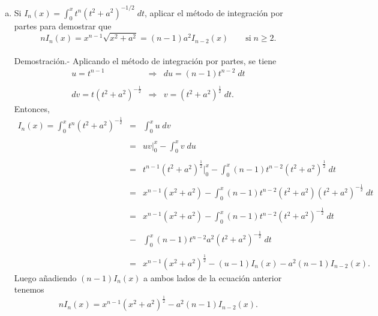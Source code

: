 \begin{enumerate}[\bfseries 1.]
\begin{enumerate}[a)]
	    \item Si $I_n(x)=\int_0^x t^n \left(t^2+a^2\right)^{-1/2}\; dt$, aplicar el método de integración por partes para demostrar que
	    $$nI_n(x)=x^{n-1}\sqrt{x^2+a^2}=(n-1)a^2I_{n-2}(x)\qquad \mbox{si}\; n\geq 2.$$\\
		Demostración.-\; Aplicando el método de integración por partes, se tiene
		$$
		\begin{array}{rcl}
		    u = t^{n-1} &\Rightarrow& du = (n-1)t^{n-2}\; dt\\\\
		    dv = t\left(t^2+a^2\right)^{-\frac{1}{2}} &\Rightarrow& v =  \left(t^2+a^2\right)^{\frac{1}{2}}\; dt.
		\end{array}
		$$
		Entonces,
		$$
		\begin{array}{rcl}
		    I_n(x)=\displaystyle \int_0^x t^n\left(t^2+a^2\right)^{-\frac{1}{2}}&=& \displaystyle\int_0^x u\; dv\\\\
											&=& uv\bigg|_0^x - \int_0^x v\; du\\\\
											&=& t^{n-1}\left(t^2+a^2\right)^{\frac{1}{2}}\bigg|_0^x - \displaystyle\int_0^x (n-1) t^{n-2}\left(t^2+a^2\right)^{\frac{1}{2}}\; dt\\\\
											&=& x^{n-1}\left(x^2+a^2\right) - \displaystyle\int_0^x (n-1)t^{n-2} \left(t^2+a^2\right)\left(t^2+a^2\right)^{-\frac{1}{2}}\; dt\\\\
											&=& x^{n-1}\left(x^2+a^2\right) - \displaystyle\int_0^x (n-1)t^{n-2} \left(t^2+a^2\right)^{-\frac{1}{2}}\; dt\\\\
											&-& \displaystyle\int_0^x (n-1)t^{n-2}a^2\left(t^2+a^2\right)^{-\frac{1}{2}}\; dt\\\\
											&=&x^{n-1}\left(x^2+a^2\right)^{\frac{1}{2}}-(u-1)I_n(x)-a^2(n-1)I_{n-2}(x).
		\end{array}
		$$
		Luego añadiendo $(n-1)I_n(x)$ a ambos lados de la ecuación anterior tenemos
		$$nI_n(x)=x^{n-1}\left(x^2+a^2\right)^{\frac{1}{2}}-a^2(n-1)I_{n-2}(x).$$\\


\end{enumerate}
\end{enumerate}
